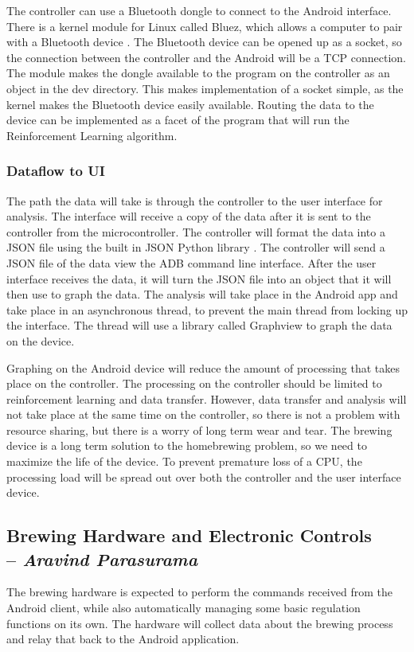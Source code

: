 \documentclass[draftclsnofoot,onecolumn,letterpaper,10pt]{IEEEtran}
\begin{document}
The controller can use a Bluetooth dongle to connect to the Android interface.
There is a kernel module for Linux called Bluez, which allows a computer to pair with a Bluetooth device \cite{Bluez}.
The Bluetooth device can be opened up as a socket, so the connection between the controller and the Android will be a TCP connection.
The module makes the dongle available to the program on the controller as an object in the dev directory.
This makes implementation of a socket simple, as the kernel makes the Bluetooth device easily available.
Routing the data to the device can be implemented as a facet of the program that will run the Reinforcement Learning algorithm.



\subsubsection{Dataflow to UI}
The path the data will take is through the controller to the user interface for analysis.
The interface will receive a copy of the data after it is sent to the controller from the microcontroller.
The controller will format the data into a JSON file using the built in JSON Python library \cite{JSONPython}.
The controller will send a JSON file of the data view the ADB command line interface.
After the user interface receives the data, it will turn the JSON file into an object that it will then use to graph the data.
The analysis will take place in the Android app and take place in an asynchronous thread, to prevent the main thread from locking up the interface.
The thread will use a library called Graphview to graph the data on the device. \cite{Graphview}

Graphing on the Android device will reduce the amount of processing that takes place on the controller.
The processing on the controller should be limited to reinforcement learning and data transfer.
However, data transfer and analysis will not take place at the same time on the controller, so there is not a problem with resource sharing, but there is a worry of long term wear and tear.
The brewing device is a long term solution to the homebrewing problem, so we need to maximize the life of the device.
To prevent premature loss of a CPU, the processing load will be spread out over both the controller and the user interface device.

\subsection{Brewing Hardware and Electronic Controls \\-- \textbf{\textit{Aravind Parasurama}}}\label{sec:hardware}
The brewing hardware is expected to perform the commands received from the Android client, while also automatically managing
some basic regulation functions on its own. The hardware will collect data about the brewing process and relay that back to the
Android application.
\end{document}
